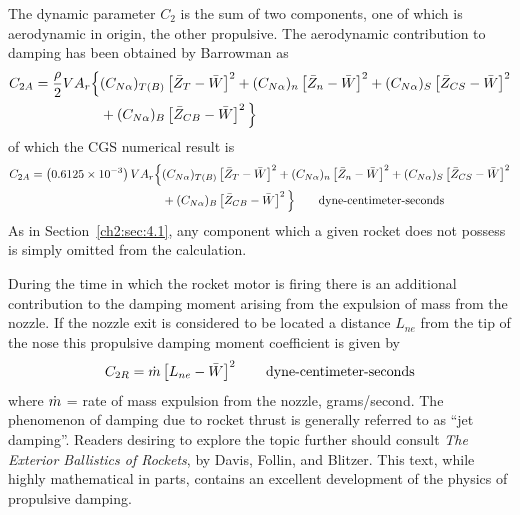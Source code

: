 The dynamic parameter $C_2$ is the sum of two components, one of which is
aerodynamic in origin, the other propulsive. The aerodynamic contribution to
damping has been obtained by Barrowman as
\begin{equation}\label{ch2:eq:97}
\begin{split}
C_{2A} = \frac{\rho}{2}VA_r\Big\{&(C_{N\alpha})_{T(B)}\left[\bar{Z}_T - \bar{W}\right]^{2} + (C_{N\alpha})_n\left[\bar{Z}_n - \bar{W}\right]^{2} + (C_{N\alpha})_S\left[\bar{Z}_{CS} - \bar{W}\right]^{2}\\
&+ (C_{N\alpha})_B\left[\bar{Z}_{CB} - \bar{W}\right]^{2}\Big\}
\end{split}
\end{equation}
of which the CGS numerical result is
\begin{equation}\label{ch2:eq:98}
\begin{split}
C_{2A} = \left(0.6125 \times 10^{-3}\right)VA_r\Big\{&(C_{N\alpha})_{T(B)}\left[\bar{Z}_T - \bar{W}\right]^{2} + (C_{N\alpha})_n\left[\bar{Z}_n - \bar{W}\right]^{2} + (C_{N\alpha})_S\left[\bar{Z}_{CS} - \bar{W}\right]^{2}\\
&+ (C_{N\alpha})_B\left[\bar{Z}_{CB} - \bar{W}\right]^{2}\Big\} \qquad \text{dyne-centimeter-seconds}
\end{split}
\end{equation}
As in Section~\ref{ch2:sec:4.1}, any component which a given rocket does not
possess is simply omitted from the calculation.

During the time in which the rocket motor is firing there is an additional
contribution to the damping moment arising from the expulsion of mass from
the nozzle. If the nozzle exit is considered to be located a distance
$L_{ne}$ from the tip of the nose this propulsive damping moment coefficient
is given by
\begin{equation}\label{ch2:eq:99}
C_{2R} = \dot{m}\left[L_{ne} - \bar{W}\right]^{2} \qquad \text{dyne-centimeter-seconds}
\end{equation}
where $\dot{m}$ = rate of mass expulsion from the nozzle, grams/second. The
phenomenon of damping due to rocket thrust is generally referred to as ``jet
damping''. Readers desiring to explore the topic further should consult
\emph{The Exterior Ballistics of Rockets}, by Davis, Follin, and Blitzer.
This text, while highly mathematical in parts, contains an excellent
development of the physics of propulsive damping.


